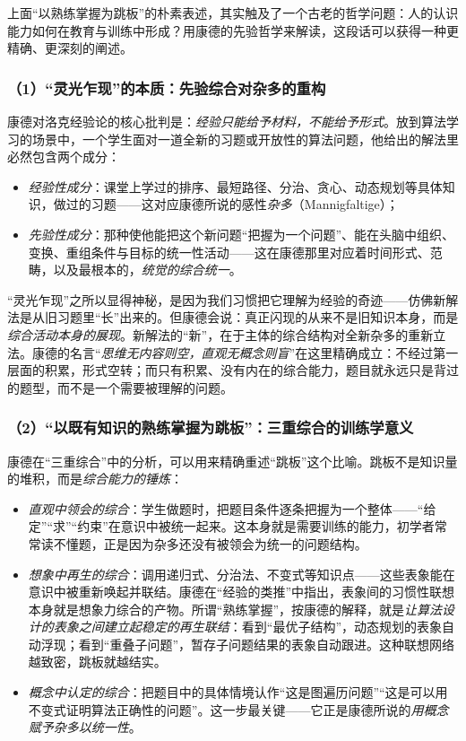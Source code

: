 上面“以熟练掌握为跳板”的朴素表述，其实触及了一个古老的哲学问题：人的认识能力如何在教育与训练中形成？用康德的先验哲学来解读，这段话可以获得一种更精确、更深刻的阐述。

\subsubsection{（1）“灵光乍现”的本质：先验综合对杂多的重构}

康德对洛克经验论的核心批判是：\textit{经验只能给予材料，不能给予形式}。放到算法学习的场景中，一个学生面对一道全新的习题或开放性的算法问题，他给出的解法里必然包含两个成分：
\begin{itemize}
    \item \textit{经验性成分}：课堂上学过的排序、最短路径、分治、贪心、动态规划等具体知识，做过的习题——这对应康德所说的感性\textit{杂多}（Mannigfaltige）；
    \item \textit{先验性成分}：那种使他能把这个新问题“把握为一个问题”、能在头脑中组织、变换、重组条件与目标的统一性活动——这在康德那里对应着时间形式、范畴，以及最根本的，\textit{统觉的综合统一}。
\end{itemize}

“灵光乍现”之所以显得神秘，是因为我们习惯把它理解为经验的奇迹——仿佛新解法是从旧习题里“长”出来的。但康德会说：真正闪现的从来不是旧知识本身，而是\textit{综合活动本身的展现}。新解法的“新”，在于主体的综合结构对全新杂多的重新立法。康德的名言“\textit{思维无内容则空，直观无概念则盲}”在这里精确成立：不经过第一层面的积累，形式空转；而只有积累、没有内在的综合能力，题目就永远只是背过的题型，而不是一个需要被理解的问题。


\subsubsection{（2）“以既有知识的熟练掌握为跳板”：三重综合的训练学意义}

康德在“三重综合”中的分析，可以用来精确重述“跳板”这个比喻。跳板不是知识量的堆积，而是\textit{综合能力的锤炼}：
\begin{itemize}
    \item \textit{直观中领会的综合}：学生做题时，把题目条件逐条把握为一个整体——“给定”“求”“约束”在意识中被统一起来。这本身就是需要训练的能力，初学者常常读不懂题，正是因为杂多还没有被领会为统一的问题结构。
    \item \textit{想象中再生的综合}：调用递归式、分治法、不变式等知识点——这些表象能在意识中被重新唤起并联结。康德在“经验的类推”中指出，表象间的习惯性联想本身就是想象力综合的产物。所谓“熟练掌握”，按康德的解释，就是\textit{让算法设计的表象之间建立起稳定的再生联结}：看到“最优子结构”，动态规划的表象自动浮现；看到“重叠子问题”，暂存子问题结果的表象自动跟进。这种联想网络越致密，跳板就越结实。
    \item \textit{概念中认定的综合}：把题目中的具体情境认作“这是图遍历问题”“这是可以用不变式证明算法正确性的问题”。这一步最关键——它正是康德所说的\textit{用概念赋予杂多以统一性}。
\end{itemize}


